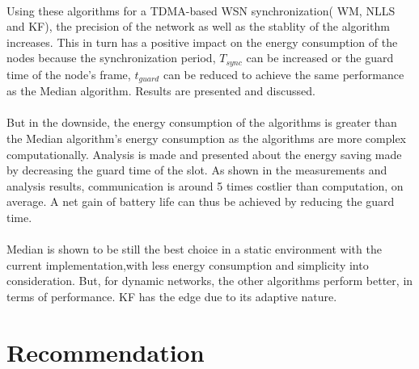 \documentclass[a4paper,10pt]{report}
\begin{document}
\paragraph*{}
Using these algorithms for a TDMA-based WSN synchronization( WM, NLLS and KF), the precision of the network as well as the stablity of the algorithm increases. This in turn has a positive impact on the energy consumption of the nodes because the synchronization period, $T_{sync}$ can be increased or the guard time of the node's frame, $t_{guard}$ can be reduced to achieve the same performance as the Median algorithm. Results are presented and discussed.
\paragraph*{}
But in the downside, the energy consumption of the algorithms is greater than the Median algorithm's energy consumption as the algorithms are more complex computationally. Analysis is made and presented about the energy saving made by decreasing the guard time of the slot. As shown in the measurements and analysis results, communication is around 5 times costlier than computation, on average. A net gain of battery life can thus be achieved by reducing the guard time.
\paragraph*{}
Median is shown to be still the best choice in a static environment with the current implementation,with less energy consumption and simplicity into consideration. But, for dynamic networks, the other algorithms perform better, in terms of performance. KF has the edge due to its adaptive nature.
\section{\textbf{Recommendation}}
\end{document}
